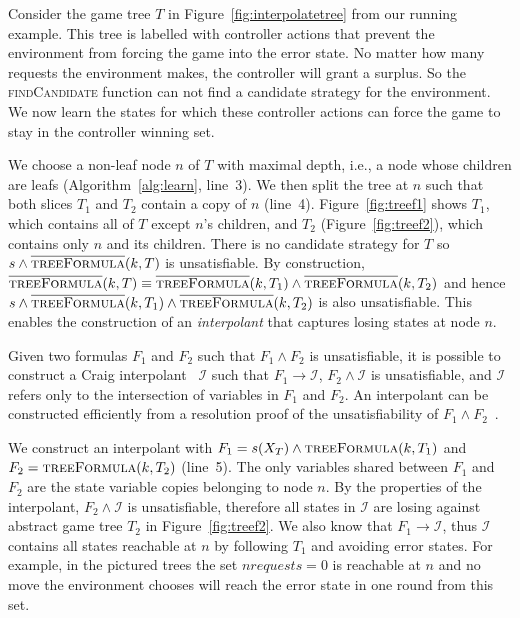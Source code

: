 \documentclass{llncs}
\newcommand{\textoverline}[1]{$\overline{\mbox{#1}}$}
\begin{document}
Consider the game tree $T$ in Figure~\ref{fig:interpolatetree} from our running
example.  This tree is labelled with controller actions that prevent the
environment from forcing the game into the error state. No matter how many
requests the environment makes, the controller will grant a surplus. So the
\textsc{findCandidate} function can not find a candidate strategy for the
environment.  We now learn the states for which these controller actions can
force the game to stay in the controller winning set.

We choose a non-leaf node $n$ of $T$ with maximal depth, i.e., a node whose
children are leafs (Algorithm~\ref{alg:learn}, line~3). We then split the tree
at $n$ such that both slices $T_1$ and $T_2$ contain a copy of $n$ (line~4).
Figure~\ref{fig:treef1} shows $T_1$, which contains all of $T$ except $n$'s
children, and $T_2$ (Figure~\ref{fig:treef2}), which contains only $n$ and its
children.  There is no candidate strategy for $T$ so $s \land
\textsc{\textoverline{treeFormula}}(k, T)$ is unsatisfiable.  By construction,
$\textsc{\textoverline{treeFormula}}(k, T) \equiv
\textsc{\textoverline{treeFormula}}(k, T_1) \land
\textsc{\textoverline{treeFormula}}(k, T_2)$ and hence $s \land
\textsc{\textoverline{treeFormula}}(k, T_1) \land
\textsc{\textoverline{treeFormula}}(k, T_2)$ is also unsatisfiable. This enables
the construction of an \emph{interpolant} that captures losing states at node
$n$.

Given two formulas $F_1$ and $F_2$ such that $F_1 \land F_2$ is unsatisfiable,
it is possible to construct a Craig interpolant~\cite{craig1957} $\mathcal{I}$
such that $F_1 \to \mathcal{I}$, $F_2 \land \mathcal{I}$ is unsatisfiable, and
$\mathcal{I}$ refers only to the intersection of variables in $F_1$ and $F_2$.
An interpolant can be constructed efficiently from a resolution proof of the
unsatisfiability of $F_1 \land F_2$~\cite{pudlak1997}.

We construct an interpolant with $F_1 = s(X_T) \land \textsc{treeFormula}(k, T_1)$
and $F_2 = \textsc{treeFormula}(k, T_2)$ (line~5). The only variables shared between $F_1$
and $F_2$ are the state variable copies belonging to node $n$. By the properties of the interpolant,
$F_2 \land \mathcal{I}$ is unsatisfiable, therefore all states in $\mathcal{I}$
are losing against abstract game tree $T_2$ in Figure~\ref{fig:treef2}.  We also know that $F_1 \to
\mathcal{I}$, thus $\mathcal{I}$ contains all states reachable at $n$ by
following $T_1$ and avoiding error states. For example, in the pictured trees
the set $nrequests = 0$ is reachable at $n$ and no move the environment chooses
will reach the error state in one round from this set.
\end{document}
